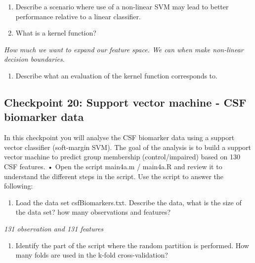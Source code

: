 \documentclass[
  letterpaper,
  DIV=11,
  numbers=noendperiod]{scrartcl}
\providecommand{\tightlist}{%
  \setlength{\itemsep}{0pt}\setlength{\parskip}{0pt}}\usepackage{longtable,booktabs,array}
\begin{document}
\begin{enumerate}
\def\labelenumi{(\alph{enumi})}
\item
  Describe a scenario where use of a non-linear SVM may lead to better
  performance relative to a linear classifier.
\item
  What is a kernel function?
\end{enumerate}

\emph{How much we want to expand our feature space. We can when make
non-linear decision boundaries.}

\begin{enumerate}
\def\labelenumi{(\alph{enumi})}
\setcounter{enumi}{2}
\tightlist
\item
  Describe what an evaluation of the kernel function corresponds to.
\end{enumerate}

\hypertarget{checkpoint-20-support-vector-machine---csf-biomarker-data}{%
\subsection{Checkpoint 20: Support vector machine - CSF biomarker
data}\label{checkpoint-20-support-vector-machine---csf-biomarker-data}}

In this checkpoint you will analyse the CSF biomarker data using a
support vector classifier (soft-margin SVM). The goal of the analysis is
to build a support vector machine to predict group membership
(control/impaired) based on 130 CSF features. • Open the script main4a.m
/ main4a.R and review it to understand the different steps in the
script. Use the script to answer the following:

\begin{enumerate}
\def\labelenumi{(\alph{enumi})}
\tightlist
\item
  Load the data set csfBiomarkers.txt. Describe the data, what is the
  size of the data set? how many observations and features?
\end{enumerate}

\emph{131 observation and 131 features}

\begin{enumerate}
\def\labelenumi{(\alph{enumi})}
\setcounter{enumi}{1}
\tightlist
\item
  Identify the part of the script where the random partition is
  performed. How many folds are used in the k-fold cross-validation?
\end{enumerate}
\end{document}
